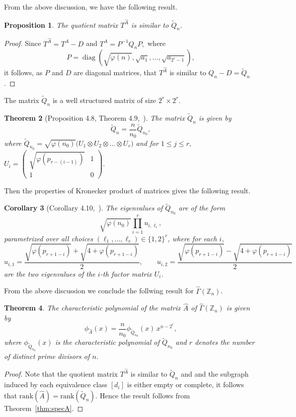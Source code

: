 \documentclass[11pt]{article}
\def \Z {{\mathbb Z}}
\newtheorem{theorem}{Theorem}[section]
\newtheorem{cor}[theorem]{Corollary}
\newtheorem{pro}[theorem]{Proposition}
\begin{document}
From the above discussion, we have the following result.
\begin{pro}
    The quotient matrix $T^{\widehat A}$ is similar to $\widetilde Q_n.$
\end{pro}
\begin{proof}
Since $T^{\widehat A}=T^A-D$ and $T^A=P^{-1}Q_nP,$
where\[P=\operatorname{diag}\!\left(\sqrt{\varphi(n)},\sqrt{a_1},\dots,\sqrt{a_{2^r-1}}\right),\] it follows, as \(P\) and \(D\) are diagonal matrices, that \(T^{\widehat A}\) is similar to \(Q_n-D=\widetilde Q_n\).
\end{proof}

The matrix $\widetilde Q_n$ is a well structured matrix of size $2^r\times 2^r$.
\begin{theorem}[Proposition 4.8, Theorem 4.9,~\cite{Me}]
    The matrix $\widetilde Q_{n}$ is given by 
    \begin{equation*}
        \widetilde Q_{n}=\frac{n}{n_0}\widetilde Q_{n_0},
       \end{equation*}
where $\widetilde Q_{n_0}=\sqrt {\varphi(n_0)}\Bigg(U_1\otimes U_2\otimes \dots \otimes U_r\Bigg)$ and for $ 1\leq j\leq r,$ 
$U_i=\begin{pmatrix} \sqrt{\varphi(p_{r-{(i-1)}})}&1\\1&0
\end{pmatrix}.$
\end{theorem}
Then the properties of Kronecker product of matrices gives the following result.
\begin{cor}[Corollary 4.10,~\cite{Me}]\label{cor:Etensor}
    The eigenvalues of $\widetilde{Q}_{n_0}$ are of the form
    $$\sqrt{\varphi(n_0)}\prod_{i=1}^{r} u_{i,\ell_i},$$
    parametrized over all choices $(\ell_1,\ldots,\ell_r)\in\{1,2\}^r$, 
    where for each $i$,
    $$u_{i,1} = \frac{\sqrt{\varphi(p_{r+1-i})} + \sqrt{4 + 
    \varphi(p_{r+1-i})}}{2}, \qquad u_{i,2} = \frac{\sqrt{\varphi
    (p_{r+1-i})} - \sqrt{4 + \varphi(p_{r+1-i})}}{2}$$
    are the two eigenvalues of the $i$-th factor matrix $U_i$.
    \end{cor}
From the above discussion we conclude the follwing result for $\widehat\Gamma(\Z_n)$.
\begin{theorem}\label{thm:Aloop}
The characteristic polynomial of the matrix $\widehat A$ of $\widehat \Gamma(\Z_n)$ is given by  
$$\phi_{\widehat A}(x)=\frac{n}{n_0}\phi_{\widetilde Q_{n_0}}(x)\,{x^{n-2^r}},$$
where $\phi_{\widetilde Q_{n_0}}(x)$ is the characteristic polynomial of $\widetilde Q_{n_0}$ and $r$ denotes the number of distinct prime divisors of $n.$
\end{theorem}
\begin{proof}
Note that the quotient matrix $T^{\widehat A}$ is similar to $\widetilde Q_n$ and and the subgraph induced by each equivalence class $[d_i]$ is either empty or complete, it follows that $\mathrm{rank}(\widehat A)=\mathrm{rank}(\widetilde Q_n).$ Hence the result follows from Theorem~\ref{thm:specA}.
\end{proof}
\end{document}
